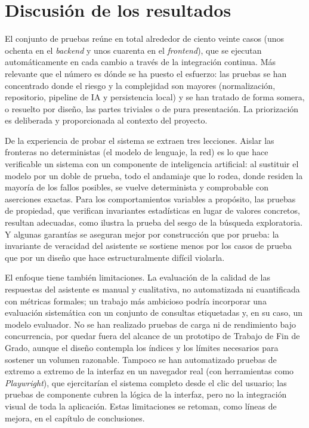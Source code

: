 \section{Discusión de los resultados}
\label{sec:test-discusion}

El conjunto de pruebas reúne en total alrededor de ciento veinte casos (unos
ochenta en el \emph{backend} y unos cuarenta en el \emph{frontend}), que se
ejecutan automáticamente en cada cambio a través de la integración continua. Más
relevante que el número es dónde se ha puesto el esfuerzo: las pruebas se han
concentrado donde el riesgo y la complejidad son mayores (normalización,
repositorio, pipeline de IA y persistencia local) y se han tratado de forma somera,
o resuelto por diseño, las partes triviales o de pura presentación. La priorización
es deliberada y proporcionada al contexto del proyecto.

De la experiencia de probar el sistema se extraen tres lecciones. Aislar las
fronteras no deterministas (el modelo de lenguaje, la red) es lo que hace
verificable un sistema con un componente de inteligencia artificial: al sustituir
el modelo por un doble de prueba, todo el andamiaje que lo rodea, donde residen la
mayoría de los fallos posibles, se vuelve determinista y comprobable con
aserciones exactas. Para los comportamientos variables a propósito, las pruebas de
propiedad, que verifican invariantes estadísticas en lugar de valores concretos,
resultan adecuadas, como ilustra la prueba del sesgo de la búsqueda exploratoria.
Y algunas garantías se aseguran mejor por construcción que por prueba: la
invariante de veracidad del asistente se sostiene menos por los casos de prueba
que por un diseño que hace estructuralmente difícil violarla.

El enfoque tiene también limitaciones. La evaluación de la calidad de las
respuestas del asistente es manual y cualitativa, no automatizada ni cuantificada
con métricas formales; un trabajo más ambicioso podría incorporar una evaluación
sistemática con un conjunto de consultas etiquetadas y, en su caso, un modelo
evaluador. No se han realizado pruebas de carga ni de rendimiento bajo
concurrencia, por quedar fuera del alcance de un prototipo de Trabajo de Fin de
Grado, aunque el diseño contempla los índices y los límites necesarios para
sostener un volumen razonable. Tampoco se han automatizado pruebas de extremo a
extremo de la interfaz en un navegador real (con herramientas como
\emph{Playwright}), que ejercitarían el sistema completo desde el clic del
usuario; las pruebas de componente cubren la lógica de la interfaz, pero no la
integración visual de toda la aplicación. Estas limitaciones se retoman, como
líneas de mejora, en el capítulo de conclusiones.

